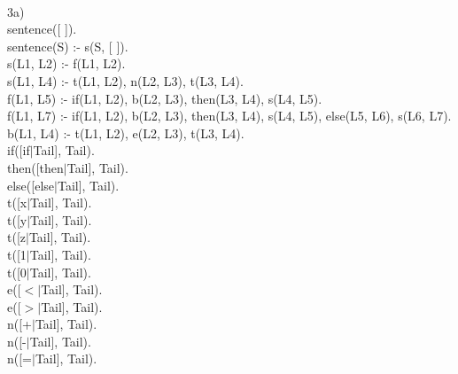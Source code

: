 \documentclass[12pt]{article}
\begin{document}
\hrulefill \\
\pagebreak


\noindent 3a)\\
sentence([ ]).\\
sentence(S) :- s(S, [ ]).\\

\noindent s(L1, L2) :- f(L1, L2).\\
s(L1, L4) :- t(L1, L2), n(L2, L3), t(L3, L4).\\

\noindent f(L1, L5) :- if(L1, L2), b(L2, L3), then(L3, L4), s(L4, L5).\\
\noindent f(L1, L7) :- if(L1, L2), b(L2, L3), then(L3, L4), s(L4, L5), else(L5, L6), s(L6, L7).\\

\noindent b(L1, L4) :- t(L1, L2), e(L2, L3), t(L3, L4).\\

\noindent if([if$|$Tail], Tail).\\
then([then$|$Tail], Tail).\\
else([else$|$Tail], Tail).\\

\noindent t([x$|$Tail], Tail).\\
t([y$|$Tail], Tail).\\
t([z$|$Tail], Tail).\\
t([1$|$Tail], Tail).\\
t([0$|$Tail], Tail).\\

\noindent e([$<$$|$Tail], Tail).\\
e([$>$$|$Tail], Tail).\\

\noindent n([+$|$Tail], Tail).\\
n([-$|$Tail], Tail).\\
n([=$|$Tail], Tail).\\\\


\pagebreak
\hrulefill \\
\end{document}
